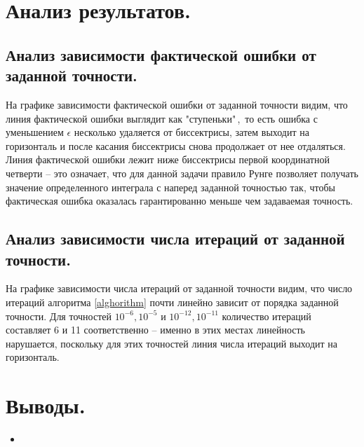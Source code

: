 \documentclass[a4paper, 12pt]{article}
\begin{document}
	\section{Анализ результатов.}
	
	\subsection{Анализ зависимости фактической ошибки от заданной точности.} 
	
	На графике зависимости фактической ошибки от заданной точности видим, что линия фактической ошибки выглядит как "ступеньки"\,,\ то есть ошибка с уменьшением $\epsilon$ несколько удаляется от биссектрисы, затем выходит на горизонталь и после касания биссектрисы снова продолжает от нее отдаляться. Линия фактической ошибки лежит ниже биссектрисы первой координатной четверти -- это означает, что для данной задачи правило Рунге позволяет получать значение определенного интеграла с наперед заданной точностью так, чтобы фактическая ошибка оказалась гарантированно меньше чем задаваемая точность. 
	
	\subsection{Анализ зависимости числа итераций от заданной точности.}
	
	На графике зависимости числа итераций от заданной точности видим, что число итераций алгоритма \ref{alghorithm} почти линейно зависит от порядка заданной точности. Для точностей $10^{-6},10^{-5}$ и $10^{-12},10^{-11}$ количество итераций составляет 6 и 11 соответственно -- именно в этих местах линейность нарушается, поскольку для этих точностей линия числа итераций выходит на горизонталь.
	
	\section{Выводы.}
	
	\begin{itemize}
		\item 
	\end{itemize}
	
\end{document}
